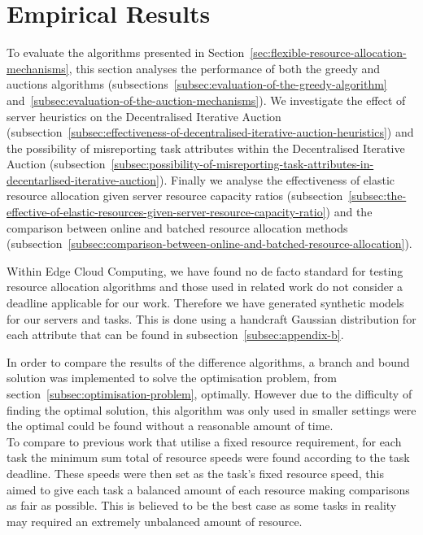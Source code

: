 \section{Empirical Results}
\label{sec:empirical-results}
To evaluate the algorithms presented in Section~\ref{sec:flexible-resource-allocation-mechanisms},
this section analyses the performance of both the greedy and auctions algorithms
(subsections~\ref{subsec:evaluation-of-the-greedy-algorithm} and~\ref{subsec:evaluation-of-the-auction-mechanisms}).
We investigate the effect of server heuristics on the Decentralised Iterative Auction
(subsection~\ref{subsec:effectiveness-of-decentralised-iterative-auction-heuristics}) and
the possibility of misreporting task attributes within the Decentralised Iterative Auction
(subsection~\ref{subsec:possibility-of-misreporting-task-attributes-in-decentarlised-iterative-auction}).
Finally we analyse the effectiveness of elastic resource allocation given server resource capacity ratios
(subsection~\ref{subsec:the-effective-of-elastic-resources-given-server-resource-capacity-ratio})
and the comparison between online and batched resource allocation methods
(subsection~\ref{subsec:comparison-between-online-and-batched-resource-allocation}).

Within Edge Cloud Computing, we have found no de facto standard for testing resource allocation algorithms and
those used in related work do not consider a deadline applicable for our work. Therefore we have generated synthetic
models for our servers and tasks. This is done using a handcraft Gaussian distribution for each attribute that can be
found in subsection~\ref{subsec:appendix-b}.

In order to compare the results of the difference algorithms, a branch and bound solution was implemented to solve
the optimisation problem, from section~\ref{subsec:optimisation-problem}, optimally. However due to the difficulty of
finding the optimal solution, this algorithm was only used in smaller settings were the optimal could be found without
a reasonable amount of time. \\
To compare to previous work that utilise a fixed resource requirement, for each task the minimum sum total of resource
speeds were found according to the task deadline. These speeds were then set as the task's fixed resource speed, this
aimed to give each task a balanced amount of each resource making comparisons as fair as possible. This is believed to
be the best case as some tasks in reality may required an extremely unbalanced amount of resource.

